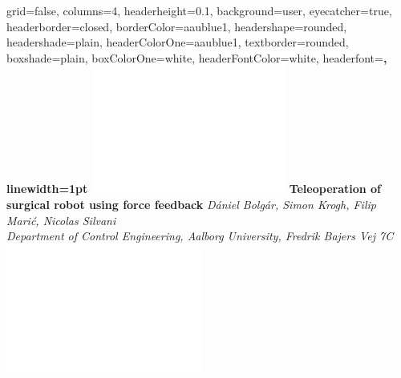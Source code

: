 \documentclass[a0paper,landscape]{baposter}
\begin{document}
\begin{poster}{
  grid=false,
  columns=4,
  headerheight=0.1\textheight,
  background=user,
  eyecatcher=true,
  headerborder=closed,
  borderColor=aaublue1,
  headershape=rounded,%
  headershade=plain,
  headerColorOne=aaublue1,
  textborder=rounded,%
  boxshade=plain,
  boxColorOne=white,
  headerFontColor=white,
  headerfont=\Large\sf\bf,
  linewidth=1pt
}
{
  \includegraphics[height=0.75\headerheight]{aau_logo_new_neg}
}
{\color{white}\bf
  Teleoperation of surgical robot using force feedback
}
{\vspace{0.3em}\color{white}\small
  \textit{\vspace{0.1em}Dániel Bolgár, Simon Krogh, Filip Marić, Nicolas Silvani\\
  Department of Control Engineering, Aalborg University, Fredrik Bajers Vej 7C}
}
{
  \includegraphics[height=0.75\headerheight]{aau_logo_new_neg}
}



\end{poster}
\end{document}
